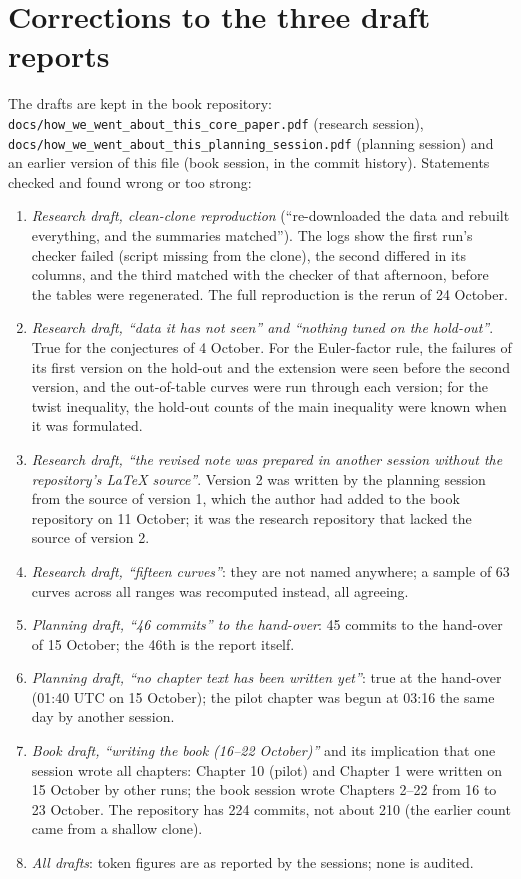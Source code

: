 \documentclass[11pt,a4paper]{article}
\begin{document}
\appendix
\section{Corrections to the three draft reports}\label{app:factcheck}
The drafts are kept in the book repository: \texttt{docs/how\_we\_went\_about\_this\_core\_paper.pdf} (research session), \texttt{docs/how\_we\_went\_about\_this\_planning\_session.pdf} (planning session) and an earlier version of this file (book session, in the commit history). Statements checked and found wrong or too strong:
\begin{enumerate}
\item \emph{Research draft, clean-clone reproduction} (``re-downloaded the data and rebuilt everything, and the summaries matched''). The logs show the first run's checker failed (script missing from the clone), the second differed in its columns, and the third matched with the checker of that afternoon, before the tables were regenerated. The full reproduction is the rerun of 24 October.
\item \emph{Research draft, ``data it has not seen'' and ``nothing tuned on the hold-out''}. True for the conjectures of 4 October. For the Euler-factor rule, the failures of its first version on the hold-out and the extension were seen before the second version, and the out-of-table curves were run through each version; for the twist inequality, the hold-out counts of the main inequality were known when it was formulated.
\item \emph{Research draft, ``the revised note was prepared in another session without the repository's LaTeX source''}. Version 2 was written by the planning session from the source of version 1, which the author had added to the book repository on 11 October; it was the research repository that lacked the source of version 2.
\item \emph{Research draft, ``fifteen curves''}: they are not named anywhere; a sample of 63 curves across all ranges was recomputed instead, all agreeing.
\item \emph{Planning draft, ``46 commits'' to the hand-over}: 45 commits to the hand-over of 15 October; the 46th is the report itself.
\item \emph{Planning draft, ``no chapter text has been written yet''}: true at the hand-over (01:40 UTC on 15 October); the pilot chapter was begun at 03:16 the same day by another session.
\item \emph{Book draft, ``writing the book (16--22 October)''} and its implication that one session wrote all chapters: Chapter 10 (pilot) and Chapter 1 were written on 15 October by other runs; the book session wrote Chapters 2--22 from 16 to 23 October. The repository has 224 commits, not about 210 (the earlier count came from a shallow clone).
\item \emph{All drafts}: token figures are as reported by the sessions; none is audited.
\end{enumerate}
\end{document}
